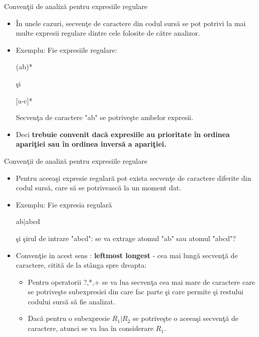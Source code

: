 \documentclass[pdf]{beamer}
\begin{document}
\begin{frame}{Convenţii de analiză pentru expresiile regulare}
\begin{itemize}
\item
În unele cazuri, secvenţe de caractere din codul sursă se pot potrivi la mai multe expresii regulare dintre cele folosite de către analizor.
\item 
Exemplu: Fie expresiile regulare: 

{\hfil (ab)* }

şi 

{\hfil [a-c]*}

Secvenţa de caractere "ab" se potriveşte ambelor expresii. 
\item
Deci \textbf{  trebuie convenit dacă expresiile au prioritate în ordinea apariţiei sau în ordinea inversă a apariţiei.}
\end{itemize}
\end{frame}

\begin{frame}{Convenţii de analiză pentru expresiile regulare}
\begin{itemize}
\item 
Pentru aceeaşi expresie regulară pot exista secvenţe de caractere diferite din codul sursă, care să se potrivească la un moment dat.
\item
Exemplu: Fie expresia regulară 

{\hfil ab|abcd}

şi şirul de intrare "abcd": se va extrage atomul "ab" sau atomul "abcd"?
\item 
Convenţie in acest sens  : \textbf {leftmost longest} - cea mai lungă secvenţă de caractere, citită de la stânga spre dreapta:
\begin{itemize}
\item
Pentru operatorii ?,*,+ se va lua secvenţa cea mai mare de caractere care se potriveşte subexpresiei din care fac parte şi care permite şi restului codului sursă să fie analizat.
\item
Dacă pentru o subexpresie $R_1|R_2$ se potriveşte o aceeaşi secvenţă de caractere, atunci se va lua  în considerare $R_1$.
\end{itemize}
\end{itemize}
\end{frame}
\end{document}
